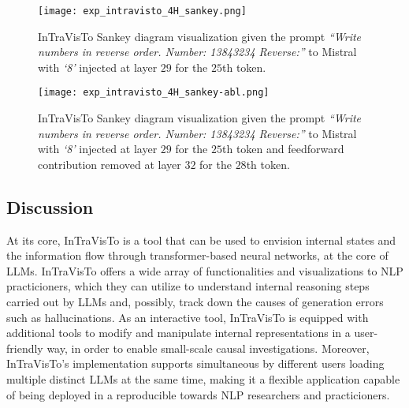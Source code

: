 \begin{figure}[t!]
    \centering
    \texttt{[image: exp\_intravisto\_4H\_sankey.png]}
    \caption[InTraVisTo Sankey diagram visualization given the prompt \emph{``Write numbers in reverse order. Number: 13843234 Reverse:''} to Mistral with injection.]{InTraVisTo Sankey diagram visualization given the prompt \emph{``Write numbers in reverse order. Number: 13843234 Reverse:''} to Mistral with \emph{`8'} injected at layer $29$ for the $25$th token.}
    \label{fig:exp_intravisto_4_H1}
\end{figure}
\begin{figure}[t!]
    \centering
    \texttt{[image: exp\_intravisto\_4H\_sankey-abl.png]}
    \caption[InTraVisTo Sankey diagram visualization given the prompt \emph{``Write numbers in reverse order. Number: 13843234 Reverse:''} to Mistral with injection and ablation.]{InTraVisTo Sankey diagram visualization given the prompt \emph{``Write numbers in reverse order. Number: 13843234 Reverse:''} to Mistral with \emph{`8'} injected at layer $29$ for the $25$th token and feedforward contribution removed at layer $32$ for the $28$th token.}
    \label{fig:exp_intravisto_4_H2}
\end{figure}

\subsection{Discussion}

At its core, InTraVisTo is a tool that can be used to envision internal states and the information flow through transformer-based neural networks, at the core of LLMs.
InTraVisTo offers a wide array of functionalities and visualizations to NLP practicioners, which they can utilize to understand internal reasoning steps carried out by LLMs and, possibly, track down the causes of generation errors such as hallucinations.
As an interactive tool, InTraVisTo is equipped with additional tools to modify and manipulate internal representations in a user-friendly way, in order to enable small-scale causal investigations.
Moreover, InTraVisTo's implementation supports simultaneous  by different users loading multiple distinct LLMs at the same time, making it a flexible application capable of being deployed in a reproducible   towards NLP researchers and practicioners.

